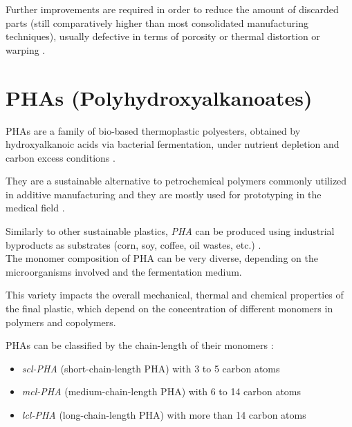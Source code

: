 \documentclass{article}
\begin{document}
    Further improvements are required in order to reduce the amount of discarded parts (still comparatively 
    higher than most consolidated manufacturing techniques), usually defective in terms of porosity or 
    thermal distortion or warping \autocite*{Padovano_SLS_Review}. \\ 

    
    \clearpage

    \section{PHAs (Polyhydroxyalkanoates)  \label{PHA_in_general}}

    PHAs are a family of bio-based thermoplastic polyesters, obtained by hydroxyalkanoic acids via bacterial fermentation, under 
    nutrient depletion and carbon excess conditions \autocites{Kovalcik_PHA_Review}{Messori_Bondioli_PHAs}. 

    They are a sustainable alternative to petrochemical polymers commonly utilized in 
    additive manufacturing and they are mostly used for prototyping in the medical field \autocites{Kovalcik_PHA_Review}{Messori_Bondioli_PHAs}. 

    Similarly to other sustainable plastics, \textit{PHA} can be produced using industrial byproducts as substrates (corn, soy, coffee, oil wastes, etc.)
    \autocite{Kovalcik_PHA_Review}. \\ 

    The monomer composition of PHA can be very diverse, depending on the microorganisms involved and the fermentation medium. 
    
    This variety impacts the overall mechanical, thermal and chemical properties of the final plastic, which depend on the concentration of 
    different monomers in polymers and copolymers. 

    PHAs can be classified by the chain-length of their monomers \autocite*{Messori_Bondioli_PHAs}: 

    \begin{itemize}
        \item \textit{scl-PHA} (short-chain-length PHA) with 3 to 5 carbon atoms
        \item \textit{mcl-PHA} (medium-chain-length PHA) with 6 to 14 carbon atoms
        \item \textit{lcl-PHA} (long-chain-length PHA) with more than 14 carbon atoms
    \end{itemize}
\end{document}
